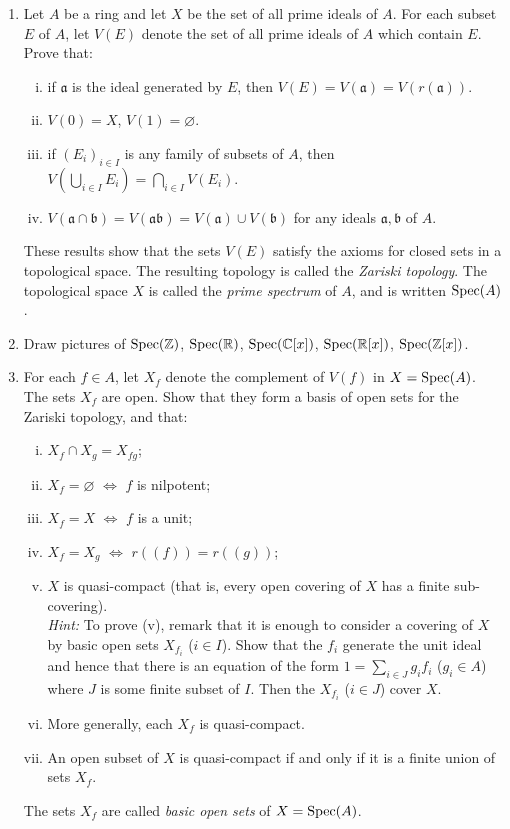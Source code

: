 \begin{enumerate}
    \emph{The prime spectrum of a ring.}
    \item \label{exer15-chapter1}Let $A$ be a ring and let $X$ be the set of all prime ideals of $A$. For each subset $E$ of $A$, let $V(E)$ denote the set of all prime ideals of $A$ which contain $E$. Prove that:
    \begin{enumerate}[i)]
        \item if $\mathfrak{a}$ is the ideal generated by $E$, then $V(E) = V(\mathfrak{a}) = V(r(\mathfrak{a}))$.
        \item $V(0) = X$, $V(1) = \varnothing$.
        \item if $(E_i)_{i \in I}$ is any family of subsets of $A$, then $V(\bigcup_{i \in I} E_i) = \bigcap_{i \in I} V(E_i)$.
        \item $V(\mathfrak{a} \cap \mathfrak{b}) = V(\mathfrak{a}\mathfrak{b}) = V(\mathfrak{a}) \cup V(\mathfrak{b})$ for any ideals $\mathfrak{a}, \mathfrak{b}$ of $A$.
    \end{enumerate}
    These results show that the sets $V(E)$ satisfy the axioms for closed sets in a topological space. The resulting topology is called the \emph{Zariski topology}. The topological space $X$ is called the \emph{prime spectrum} of $A$, and is written $\operatorname{Spec}(A)$.

    \item \label{exer16-chapter1}Draw pictures of $\operatorname{Spec}(\mathbb{Z})$, $\operatorname{Spec}(\mathbb{R})$, $\operatorname{Spec}(\mathbb{C}[x])$, $\operatorname{Spec}(\mathbb{R}[x])$, $\operatorname{Spec}(\mathbb{Z}[x])$.

    \item \label{exer17-chapter1}For each $f \in A$, let $X_f$ denote the complement of $V(f)$ in $X = \operatorname{Spec}(A)$. The sets $X_f$ are open. Show that they form a basis of open sets for the Zariski topology, and that:
    \begin{enumerate}[i)]
        \item $X_f \cap X_g = X_{fg}$;
        \item $X_f = \varnothing$ $\iff$ $f$ is nilpotent;
        \item $X_f = X$ $\iff$ $f$ is a unit;
        \item $X_f = X_g$ $\iff$ $r((f)) = r((g))$;
        \item $X$ is quasi-compact (that is, every open covering of $X$ has a finite sub-covering).\\
        \textit{Hint:} To prove (v), remark that it is enough to consider a covering of $X$ by basic open sets $X_{f_i}$ ($i \in I$). Show that the $f_i$ generate the unit ideal and hence that there is an equation of the form $1 = \sum_{i \in J} g_i f_i$ ($g_i \in A$) where $J$ is some finite subset of $I$. Then the $X_{f_i}$ ($i \in J$) cover $X$.
        \item More generally, each $X_f$ is quasi-compact.
        \item An open subset of $X$ is quasi-compact if and only if it is a finite union of sets $X_f$.
    \end{enumerate}
    The sets $X_f$ are called \emph{basic open sets} of $X = \operatorname{Spec}(A)$.


\end{enumerate}
